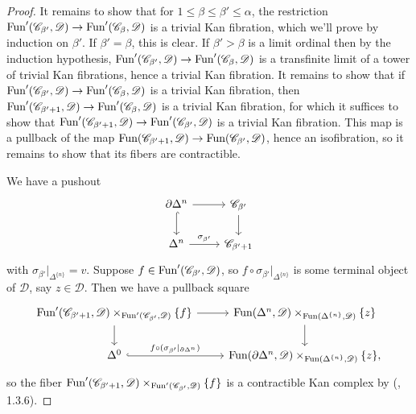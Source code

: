 \documentclass{tac}
\newcommand{\s}[1]{\mathscr{#1}}
\newcommand{\tx}[1]{\textnormal{#1}}
\begin{document}
\begin{proof}
It remains to show that for $1\leq \beta\leq \beta' \leq\alpha$, the restriction $\tx{Fun}' (\s{C}_{\beta'} , \s{D}) \to \tx{Fun}' (\s{C}_\beta , \s{D})$ is a trivial Kan fibration, which we'll prove by induction on $\beta'$.  If $\beta' = \beta$, this is clear.  If $\beta' >\beta$ is a limit ordinal then by the induction hypothesis, $\tx{Fun}' (\s{C}_{\beta'} , \s{D}) \to \tx{Fun}' (\s{C}_\beta , \s{D})$ is a transfinite limit of a tower of trivial Kan fibrations, hence a trivial Kan fibration.  It remains to show that if $\tx{Fun}' (\s{C}_{\beta'} , \s{D}) \to \tx{Fun}' (\s{C}_\beta , \s{D})$ is a trivial Kan fibration, then $\tx{Fun}' (\s{C}_{\beta'+1} , \s{D}) \to \tx{Fun}' (\s{C}_\beta , \s{D})$ is a trivial Kan fibration, for which it suffices to show that $\tx{Fun}' (\s{C}_{\beta'+1} , \s{D}) \to \tx{Fun}' (\s{C}_{\beta'} , \s{D})$ is a trivial Kan fibration.  This map is a pullback of the map $\tx{Fun} (\s{C}_{\beta'+1} , \s{D}) \to \tx{Fun} (\s{C}_{\beta'} , \s{D})$, hence an isofibration, so it remains to show that its fibers are contractible.

We have a pushout
\[\begin{tikzcd}
\partial \Delta^n \arrow[]{r} \arrow[hook]{d} & \s{C}_{\beta'}\arrow[]{d} \\
\Delta^n \arrow[]{r}{\sigma_{\beta'}} &  \s{C}_{\beta'+1}
\end{tikzcd}\]
with $\sigma_{\beta'} |_{\Delta^{\{n \}}} = v$.  Suppose $f \in \tx{Fun}'(\s{C}_{\beta'} ,\s{D})$, so $f\circ \sigma_{\beta'} |_{\Delta^{\{n\}}}$ is some terminal object of $\s{D}$, say $z\in\s{D}$.  Then we have a pullback square 
\[\begin{tikzcd}
\tx{Fun}' (\s{C}_{\beta'+1} , \s{D}) \times_{\tx{Fun}' (\s{C}_{\beta'} , \s{D})} \{f \} \arrow[]{r} \arrow[]{d} & \tx{Fun}(\Delta^n , \s{D})\times_{\tx{Fun}(\Delta^{\{n \}} , \s{D}) } \{z\} \arrow[]{d} \\ 
\Delta^0 \arrow[hook]{r}{f\circ ( \sigma_{\beta'}|_{\partial \Delta^n})}& \tx{Fun}(\partial\Delta^n , \s{D})\times_{\tx{Fun}(\Delta^{\{n \}} , \s{D}) } \{z\},
\end{tikzcd}\]
so the fiber $\tx{Fun}' (\s{C}_{\beta'+1} , \s{D}) \times_{\tx{Fun}' (\s{C}_{\beta'} , \s{D})} \{f \}$ is a contractible Kan complex by (\cite{thesis}, 1.3.6).
\end{proof}
\end{document}
